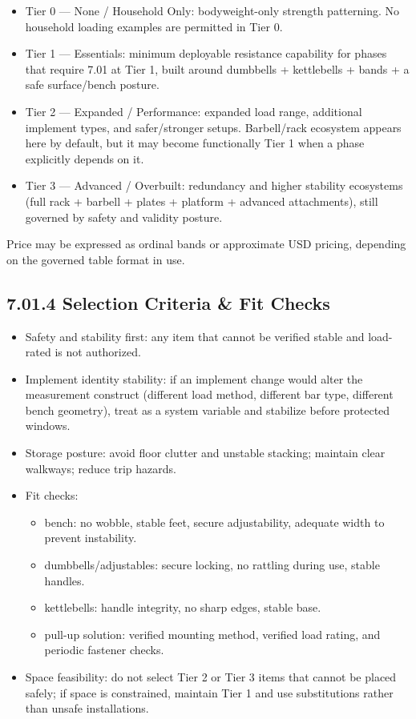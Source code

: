 \documentclass[10pt]{article}
\begin{document}
\begin{itemize}
\item Tier 0 — None / Household Only: bodyweight-only strength patterning. No household loading examples are permitted in Tier 0.
\item Tier 1 — Essentials: minimum deployable resistance capability for phases that require 7.01 at Tier 1, built around dumbbells + kettlebells + bands + a safe surface/bench posture.
\item Tier 2 — Expanded / Performance: expanded load range, additional implement types, and safer/stronger setups. Barbell/rack ecosystem appears here by default, but it may become functionally Tier 1 when a phase explicitly depends on it.
\item Tier 3 — Advanced / Overbuilt: redundancy and higher stability ecosystems (full rack + barbell + plates + platform + advanced attachments), still governed by safety and validity posture.
\end{itemize}

Price may be expressed as ordinal bands or approximate USD pricing, depending on the governed table format in use.

\subsection*{7.01.4 Selection Criteria \& Fit Checks}
{}

\begin{itemize}
\item Safety and stability first: any item that cannot be verified stable and load-rated is not authorized.
\item Implement identity stability: if an implement change would alter the measurement construct (different load method, different bar type, different bench geometry), treat as a system variable and stabilize before protected windows.
\item Storage posture: avoid floor clutter and unstable stacking; maintain clear walkways; reduce trip hazards.
\item Fit checks:
  \begin{itemize}
  \item bench: no wobble, stable feet, secure adjustability, adequate width to prevent instability.
  \item dumbbells/adjustables: secure locking, no rattling during use, stable handles.
  \item kettlebells: handle integrity, no sharp edges, stable base.
  \item pull-up solution: verified mounting method, verified load rating, and periodic fastener checks.
  \end{itemize}
\item Space feasibility: do not select Tier 2 or Tier 3 items that cannot be placed safely; if space is constrained, maintain Tier 1 and use substitutions rather than unsafe installations.
\end{itemize}
\end{document}
